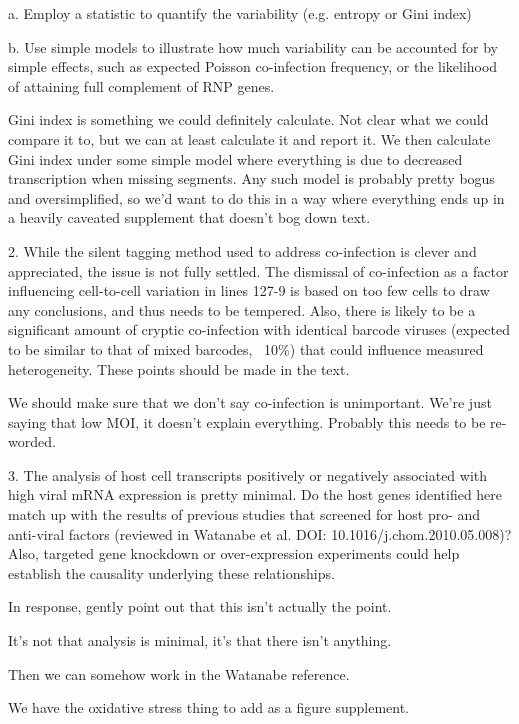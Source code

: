 \documentclass[11pt, oneside]{article}   	%
\begin{document}
    a. Employ a statistic to quantify the variability (e.g. entropy or Gini index) 

    b. Use simple models to illustrate how much variability can be accounted for by simple effects, such as expected Poisson co-infection frequency, or the likelihood of attaining full complement of RNP genes. 
    
{\color{red}
Gini index is something we could definitely calculate. Not clear what we could compare it to, but we can at least calculate it and report it.
We then calculate Gini index under some simple model where everything is due to decreased transcription when missing segments.
Any such model is probably pretty bogus and oversimplified, so we'd want to do this in a way where everything ends up in a heavily caveated supplement that doesn't bog down text.
}


2. While the silent tagging method used to address co-infection is clever and appreciated, the issue is not fully settled. The dismissal of co-infection as a factor influencing cell-to-cell variation in lines 127-9 is based on too few cells to draw any conclusions, and thus needs to be tempered. Also, there is likely to be a significant amount of cryptic co-infection with identical barcode viruses (expected to be similar to that of mixed barcodes, ~10\%) that could influence measured heterogeneity. These points should be made in the text. 

{\color{red}
We should make sure that we don't say co-infection is unimportant. We're just saying that low MOI, it doesn't explain everything. Probably this needs to be re-worded.
}

3. The analysis of host cell transcripts positively or negatively associated with high viral mRNA expression is pretty minimal. Do the host genes identified here match up with the results of previous studies that screened for host pro- and anti-viral factors (reviewed in Watanabe et al. DOI: 10.1016/j.chom.2010.05.008)? Also, targeted gene knockdown or over-expression experiments could help establish the causality underlying these relationships. 

{\color{red}
In response, gently point out that this isn't actually the point.

It's not that analysis is minimal, it's that there isn't anything.

Then we can somehow work in the Watanabe reference.

We have the oxidative stress thing to add as a figure supplement.
}
\end{document}
